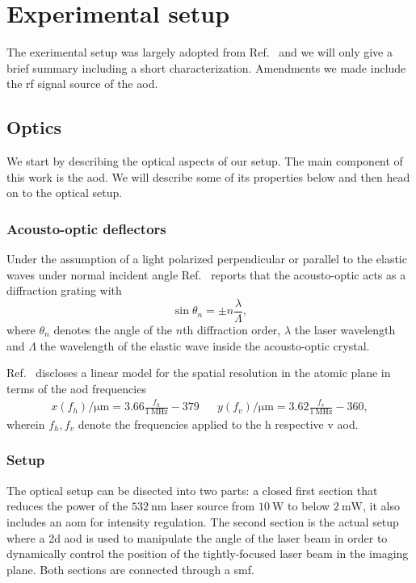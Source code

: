 \chapter{Experimental setup}\label{ch:experimental_setup}

The exerimental setup was largely adopted from Ref.~\cite{Hertlein2017} and we
will only give a brief summary including a short characterization. Amendments
we made include the \gls{rf} signal source of the \gls{aod}.

\section{Optics}

We start by describing the optical aspects of our setup. The main component
of this work is the \gls{aod}. We will describe some of its properties below
and then head on to the optical setup.

\subsection{Acousto-optic deflectors}

Under the assumption of a light polarized perpendicular or parallel to the
elastic waves under normal incident angle Ref.~\cite{Royer1999} reports that
the acousto-optic acts as a diffraction grating with
\begin{equation}
  \sin\theta_n=\pm n\frac{\lambda}{\Lambda}
  \label{eq:angle_gratting},
\end{equation}
where $\theta_n$ denotes the angle of the $n$th diffraction order, $\lambda$
the laser wavelength and $\Lambda$ the wavelength of the elastic wave inside
the acousto-optic crystal.

Ref.~\cite{Hertlein2017}
discloses a linear model for the spatial resolution in the atomic plane in
terms of the \gls{aod} frequencies
\begin{align}
  x(f_h)/\si{\micro\meter}=3.66\frac{f_h}{\SI{1}{\mega\hertz}}-379 &&
  y(f_v)/\si{\micro\meter}=3.62\frac{f_v}{\SI{1}{\mega\hertz}}-360
  \label{eq:spatial_position_frequency},
\end{align}
wherein $f_h,f_v$ denote the frequencies applied to the \gls{h} respective
\gls{v} \gls{aod}.

\subsection{Setup}

The optical setup can be disected into two parts: a closed first section that
reduces the power of the $\SI{532}{\nano\meter}$ laser source from
$\SI{10}{\watt}$ to below $\SI{2}{\milli\watt}$, it also includes an \gls{aom}
for intensity regulation. The second section is the actual setup where a
\gls{2d} \gls{aod} is used to manipulate the angle of the laser beam in order
to dynamically control the position of the tightly-focused laser beam in the
imaging plane. Both sections are connected through a \gls{smf}.

